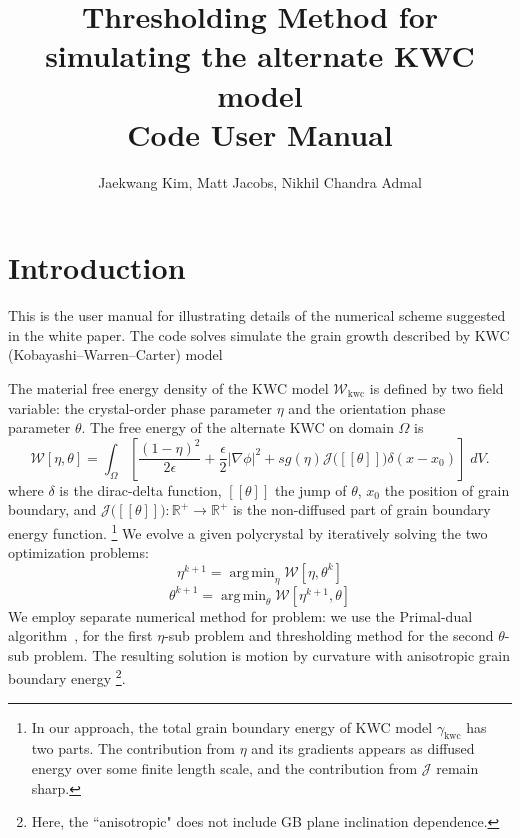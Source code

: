 \documentclass[11pt]{article}
\newcommand{\argmin}{\mathop{\mathrm{arg\,min}}}
\begin{document}
\title{Thresholding Method for simulating the alternate KWC model\\ Code User Manual}
\author{Jaekwang Kim, Matt Jacobs, Nikhil Chandra Admal} 

\maketitle 
\sectionfont{\fontsize{14}{14}\selectfont}

\normalsize

\section{Introduction}

This is the user manual for illustrating details of 
the numerical scheme suggested in the white paper.
The code solves simulate  the grain growth described by   
KWC (Kobayashi--Warren--Carter) model~\cite{KWC:1998,KWC:2001,KWC:2003}

The material free energy density of the KWC model $\mathcal{W}_{\mathrm{kwc}}$  
is defined by two field variable: the crystal-order phase parameter $\eta$ 
and the orientation phase parameter $\theta$. 
The free energy of the alternate KWC on domain $\Omega$ is 
\begin{equation}
\mathcal{W}[\eta,\theta] = \int_{\Omega}
\left[ \frac{(1-\eta)^2}{2 \epsilon} + \frac{\epsilon}{2}|\nabla \phi|^2
+sg(\eta) \mathcal{J}\big( [\![\theta ]\!]\big) \delta(x-x_0) 
\right]\; dV.
\label{eqn:alternateKWC}
\end{equation}
where $\delta$ is the dirac-delta function, 
$[\![\theta]\!]$ the jump of $\theta$, 
$x_0$ the position of grain boundary, and 
$\mathcal{J}\big( [\![\theta ]\!]\big): \mathbb{R}^{+} \to \mathbb{R}^{+}$
is the non-diffused part of grain boundary energy function.
\footnote{In our approach, the total grain boundary energy 
of KWC model $\gamma_{\mathrm{kwc}}$ has two parts. 
The contribution from $\eta$ and its gradients appears as diffused 
energy over some finite length scale, and the contribution from $\mathcal{J}$
remain sharp.
}
We evolve a given polycrystal
by iteratively solving the two optimization problems:
\begin{equation}
\eta^{k+1}=\argmin_\eta \mathcal{W}[\eta, \theta^{k}] 
\label{eqn:eta_sub}
\end{equation}
\begin{equation}
\theta^{k+1}=\argmin_\theta  \mathcal{W}[\eta^{k+1}, \theta] 
\label{eqn:theta_sub}
\end{equation}
We employ separate numerical method for problem:
we use the Primal-dual algorithm~\cite{Chambolle:2011,Jacobs:2019}, 
for the first $\eta$-sub problem and thresholding method for 
the second $\theta$-sub problem. 
The resulting solution is motion by curvature 
with anisotropic grain boundary energy
\footnote{
Here, the ``anisotropic" does not include GB plane inclination dependence.
}.
\end{document}
